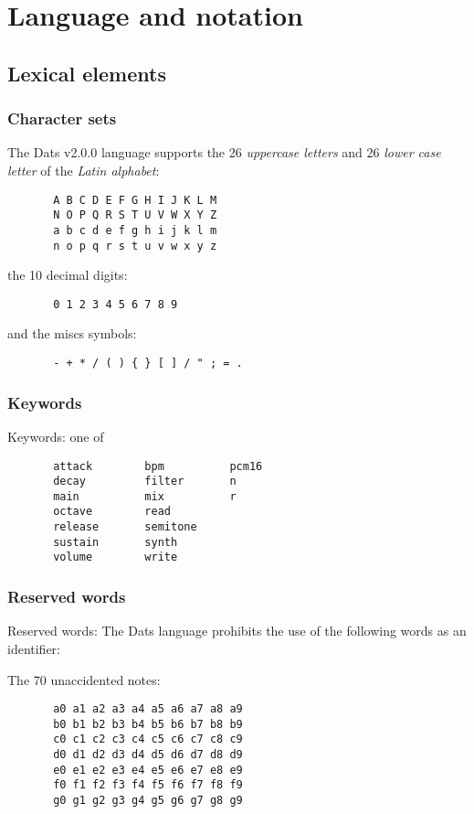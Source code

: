 \section{Language and notation}
\subsection{Lexical elements}
\subsubsection{Character sets}

The Dats v2.0.0 language supports the 26 \textit{uppercase letters} and 26
\textit{lower case letter} of the \textit{Latin alphabet}:

\begin{verbatim}
       A B C D E F G H I J K L M
       N O P Q R S T U V W X Y Z
       a b c d e f g h i j k l m
       n o p q r s t u v w x y z
\end{verbatim}

the 10 {decimal digits}:
\begin{verbatim}
       0 1 2 3 4 5 6 7 8 9
\end{verbatim}

and the miscs symbols:
\begin{verbatim}
       - + * / ( ) { } [ ] / " ; = .
\end{verbatim}

\subsubsection{Keywords}

\np Keywords: one of

\begin{verbatim}
       attack        bpm          pcm16
       decay         filter       n
       main          mix          r
       octave        read
       release       semitone
       sustain       synth
       volume        write
\end{verbatim}

\subsubsection{Reserved words}

\np Reserved words: The Dats language prohibits the use of the
following words as an identifier:

\np The 70 unaccidented notes:

\begin{verbatim}
       a0 a1 a2 a3 a4 a5 a6 a7 a8 a9
       b0 b1 b2 b3 b4 b5 b6 b7 b8 b9
       c0 c1 c2 c3 c4 c5 c6 c7 c8 c9
       d0 d1 d2 d3 d4 d5 d6 d7 d8 d9
       e0 e1 e2 e3 e4 e5 e6 e7 e8 e9
       f0 f1 f2 f3 f4 f5 f6 f7 f8 f9
       g0 g1 g2 g3 g4 g5 g6 g7 g8 g9
\end{verbatim}


